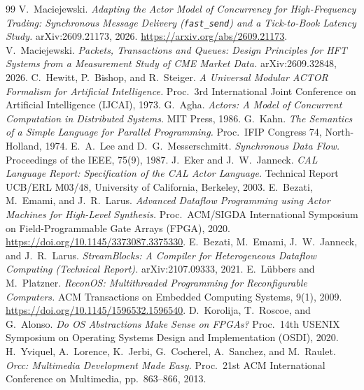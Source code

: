\documentclass[11pt]{article}
\begin{document}
\begin{thebibliography}{99}
 V.~Maciejewski.
  \emph{Adapting the Actor Model of Concurrency for High-Frequency Trading:
  Synchronous Message Delivery (\texttt{fast\_send}) and a Tick-to-Book Latency
  Study.} arXiv:2609.21173, 2026. \url{https://arxiv.org/abs/2609.21173}.
 V.~Maciejewski.
  \emph{Packets, Transactions and Queues: Design Principles for HFT Systems
  from a Measurement Study of CME Market Data.} arXiv:2609.32848, 2026.
 C.~Hewitt, P.~Bishop, and R.~Steiger.
  \emph{A Universal Modular ACTOR Formalism for Artificial Intelligence.}
  Proc.\ 3rd International Joint Conference on Artificial Intelligence (IJCAI),
  1973.
 G.~Agha.
  \emph{Actors: A Model of Concurrent Computation in Distributed Systems.}
  MIT Press, 1986.
 G.~Kahn.
  \emph{The Semantics of a Simple Language for Parallel Programming.}
  Proc.\ IFIP Congress 74, North-Holland, 1974.
 E.~A.~Lee and D.~G.~Messerschmitt.
  \emph{Synchronous Data Flow.} Proceedings of the IEEE, 75(9), 1987.
 J.~Eker and J.~W.~Janneck.
  \emph{CAL Language Report: Specification of the CAL Actor Language.}
  Technical Report UCB/ERL M03/48, University of California, Berkeley, 2003.
 E.~Bezati, M.~Emami, and J.~R.~Larus.
  \emph{Advanced Dataflow Programming using Actor Machines for High-Level
  Synthesis.} Proc.\ ACM/SIGDA International Symposium on Field-Programmable
  Gate Arrays (FPGA), 2020. \url{https://doi.org/10.1145/3373087.3375330}.
 E.~Bezati, M.~Emami, J.~W.~Janneck, and
  J.~R.~Larus. \emph{StreamBlocks: A Compiler for Heterogeneous Dataflow
  Computing (Technical Report).} arXiv:2107.09333, 2021.
 E.~L\"ubbers and M.~Platzner.
  \emph{ReconOS: Multithreaded Programming for Reconfigurable Computers.}
  ACM Transactions on Embedded Computing Systems, 9(1), 2009.
  \url{https://doi.org/10.1145/1596532.1596540}.
 D.~Korolija, T.~Roscoe, and G.~Alonso.
  \emph{Do OS Abstractions Make Sense on FPGAs?} Proc.\ 14th USENIX Symposium
  on Operating Systems Design and Implementation (OSDI), 2020.
 H.~Yviquel, A.~Lorence, K.~Jerbi, G.~Cocherel, A.~Sanchez,
  and M.~Raulet. \emph{Orcc: Multimedia Development Made Easy.} Proc.\ 21st ACM
  International Conference on Multimedia, pp.~863--866, 2013.

\end{thebibliography}
\end{document}
